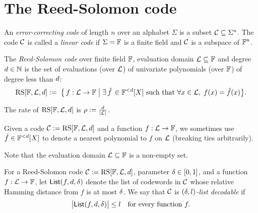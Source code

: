 \chapter{The Reed-Solomon code}

\begin{definition}\label{def:eccode}
    An \emph{error-correcting code} of length \(n\) over an alphabet \(\Sigma\) is a subset \(\mathcal{C} \subseteq \Sigma^n\). The code \(\mathcal{C}\) is called a \emph{linear code} if
    \(\Sigma = \mathbb{F}\) is a finite field and \(\mathcal{C}\) is a subspace of \({\mathbb{F}}^n\).
\end{definition}

\begin{definition}\label{def:rscode}
\leanok
    The \emph{Reed-Solomon code} over finite field $\mathbb{F}$, evaluation domain $\mathcal{L}\subseteq\mathbb{F}$ and degree $d\in\mathbb{N}$ is the set of evaluations (over $\mathcal{L}$) of univariate polynomials (over $\mathbb{F}$) of degree less than $d$:
    \[
        \mathrm{RS}[\mathbb{F},\mathcal{L},d]:=\; \bigl\{\, f : \mathcal{L} \to \mathbb{F} \;\big|\; \exists \,\hat{f} \,\in \mathbb{F}^{<d}[X]\text{ such that } \forall x \in \mathcal{L},\; f(x) = \hat{f}(x)\bigr\}.
    \]

    The rate of $\mathrm{RS}[\mathbb{F},\mathcal{L},d]$ is $\rho := \frac{d}{\lvert \mathcal{L} \rvert}$.

    Given a code $\mathcal{C} := \mathrm{RS}[\mathbb{F},\mathcal{L},d]$ and a function $f : \mathcal{L} \to \mathbb{F}$, we sometimes use $\hat{f} \in \mathbb{F}^{<d}[X]$ to denote a nearest polynomial to $f$ on $\mathcal{L}$ (breaking ties arbitrarily).
\end{definition}

\begin{remark}
Note that the evaluation domain $\mathcal{L}\subseteq\mathbb{F}$ is a non-empty set.
\end{remark}

\begin{definition}\label{def:list_decodable}
{}
    For a Reed-Solomon code $\mathcal{C} := \mathrm{RS}[\mathbb{F},\mathcal{L},d]$, parameter $\delta \in [0,1]$, 
    and a function $f:\mathcal{L}\to\mathbb{F}$, let $\mathsf{List}(f,d,\delta)$ denote the list 
    of codewords in $\mathcal{C}$ whose relative Hamming distance from $f$ is at most $\delta$.
    We say that $\mathcal{C}$ is \emph{$(\delta,l)$-list decodable} if 
    \[
    \bigl|\mathsf{List}(f,d,\delta)\bigr| \leq l
    \quad
    \text{for every function } f.
    \]
\end{definition}
    
